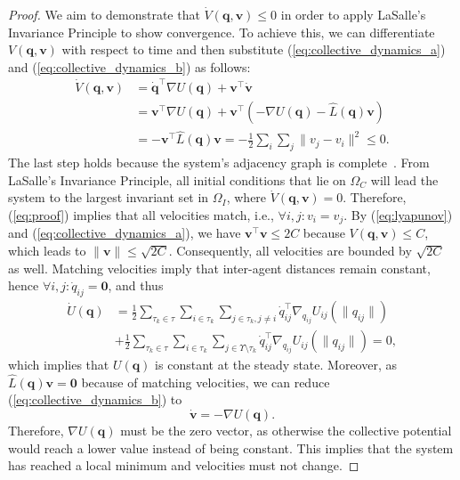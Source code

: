 \documentclass[letterpaper, 10 pt, conference]{ieeeconf}  %
\newcommand{\norm}[1]{\lVert#1\rVert}
\begin{document}
\begin{proof}
  We aim to demonstrate that $\dot{V}(\mathbf{q},\mathbf{v}) \leq 0$
  in order to apply LaSalle's Invariance Principle to show
  convergence. To achieve this, we can differentiate $V(\mathbf{q},
  \mathbf{v})$ with respect to time and then substitute
  (\ref{eq:collective_dynamics_a}) and
  (\ref{eq:collective_dynamics_b}) as follows:
  \begin{align}
    \label{eq:proof}
    \dot{V}(\mathbf{q},\mathbf{v}) &= \dot{\mathbf{q}}^\intercal
    \nabla
    U(\mathbf{q}) + \mathbf{v}^\intercal \dot{\mathbf{v}} \nonumber\\
    & = \mathbf{v}^\intercal \nabla
    U(\mathbf{q}) + \mathbf{v}^\intercal (-\nabla U(\mathbf{q}) - \hat{L}(\mathbf{q})\mathbf{v}) \nonumber\\
    & = - \mathbf{v}^\intercal \hat{L}(\mathbf{q})\mathbf{v} =
    -\frac{1}{2}\sum_i\sum_j\norm{v_j - v_i}^2 \leq 0.
  \end{align}
  The last step holds because the system's adjacency graph is
  complete~\cite{Olfati-Saber:06}. From LaSalle's Invariance
  Principle, all initial conditions that lie on $\Omega_C$ will lead
  the system to the largest invariant set in $\Omega_I$, where
  $\dot{V}(\mathbf{q},\mathbf{v}) = 0$. Therefore, (\ref{eq:proof})
  implies that all velocities match, i.e., $\forall i,j: v_i =
  v_j$. By (\ref{eq:lyapunov}) and (\ref{eq:collective_dynamics_a}),
  we have $\mathbf{v}^\intercal \mathbf{v} \leq 2C$ because
  $V(\mathbf{q}, \mathbf{v}) \leq C$, which leads to
  $\norm{\mathbf{v}} \leq \sqrt{2C}$. Consequently, all velocities are
  bounded by $\sqrt{2C}$ as well. Matching velocities imply that
  inter-agent distances remain constant, hence $\forall i,j:
  \dot{q}_{ij} = \mathbf{0}$, and thus
  \begin{align}
    \label{eq:collective_grad_time}
    \dot{U}(\mathbf{q}) &= \frac{1}{2} \sum_{\tau_k \in \tau} \sum_{i
      \in \tau_k} \sum_{j \in \tau_k, j \neq i} \dot{q}_{ij}^\intercal
    \nabla_{q_{ij}} U_{ij}(\norm{q_{ij}})
    \nonumber\\
    &+ \frac{1}{2} \sum_{\tau_k \in \tau} \sum_{i \in \tau_k} \sum_{j
      \in \Upsilon \setminus \tau_k} \dot{q}_{ij}^\intercal \nabla_{q_{ij}}
    U_{ij}(\norm{q_{ij}}) = 0,
  \end{align}
  which implies that $U(\mathbf{q})$ is constant at the steady
  state. Moreover, as $\hat{L}(\mathbf{q})\mathbf{v} = \mathbf{0}$
  because of matching velocities, we can reduce
  (\ref{eq:collective_dynamics_b}) to
  \begin{equation}
    \label{eq:stable_state_dyn}
    \dot{\mathbf{v}} = -\nabla U(\mathbf{q}).
  \end{equation}
  Therefore, $\nabla U(\mathbf{q})$ must be the zero vector, as
  otherwise the collective potential would reach a lower value
  instead of being constant. This implies that the system has reached
  a local minimum and velocities must not change.


\end{proof}
\end{document}
